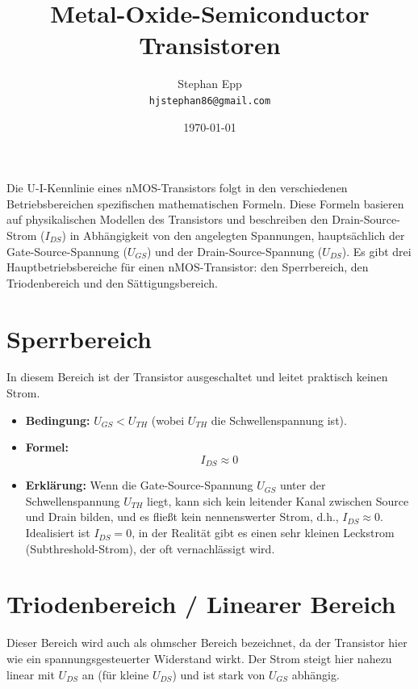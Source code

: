 \documentclass[oneside]{scrarticle}
\title{Metal-Oxide-Semiconductor Transistoren}
\author{Stephan Epp\\\texttt{hjstephan86@gmail.com}}
\date{\today}
\numberwithin{equation}{section}
\begin{document}
\maketitle
Die U-I-Kennlinie eines nMOS-Transistors folgt in den verschiedenen Betriebsbereichen spezifischen mathematischen Formeln. Diese Formeln basieren auf physikalischen Modellen des Transistors und beschreiben den Drain-Source-Strom ($I_{DS}$) in Abhängigkeit von den angelegten Spannungen, hauptsächlich der Gate-Source-Spannung ($U_{GS}$) und der Drain-Source-Spannung ($U_{DS}$). Es gibt drei Hauptbetriebsbereiche für einen nMOS-Transistor: den Sperrbereich, den Triodenbereich und den Sättigungsbereich.

\section{Sperrbereich}
In diesem Bereich ist der Transistor ausgeschaltet und leitet praktisch keinen Strom.

\begin{itemize}
	\item \textbf{Bedingung:} $U_{GS} < U_{TH}$ (wobei $U_{TH}$ die Schwellenspannung ist).
	\item \textbf{Formel:}
	\begin{equation*}
		I_{DS} \approx 0
	\end{equation*}
	\item \textbf{Erklärung:} Wenn die Gate-Source-Spannung $U_{GS}$ unter der Schwellenspannung $U_{TH}$ liegt, kann sich kein leitender Kanal zwischen Source und Drain bilden, und es fließt kein nennenswerter Strom, d.h., $I_{DS} \approx 0$. Idealisiert ist $I_{DS} = 0$, in der Realität gibt es einen sehr kleinen Leckstrom (Subthreshold-Strom), der oft vernachlässigt wird.
\end{itemize}

\section{Triodenbereich / Linearer Bereich}
Dieser Bereich wird auch als ohmscher Bereich bezeichnet, da der Transistor hier wie ein spannungsgesteuerter Widerstand wirkt. Der Strom steigt hier nahezu linear mit $U_{DS}$ an (für kleine $U_{DS}$) und ist stark von $U_{GS}$ abhängig.
\end{document}
